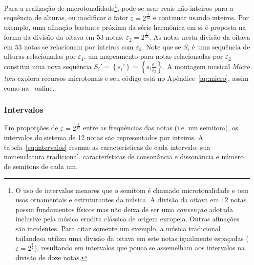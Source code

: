 Para a realização de microtonalidade\footnote{O uso de
intervalos menores que o semitom é chamado microtonalidade e tem usos
ornamentais e estruturantes da música. A
divisão da oitava em $12$ notas possui fundamentos físicos mas
não deixa de ser uma \emph{convenção}
adotada inclusive pela música erudita clássica de origem europeia. Outras afinações
são incidentes. Para citar somente um exemplo, a
música tradicional tailandesa utiliza uma divisão da oitava em sete notas igualmente
espaçadas ($\varepsilon=2^{\frac{1}{7}}$),
resultando em intervalos que pouco se assemelham aos intervalos na
divisão de doze notas.\cite{Wisnick}},
pode-se usar reais não inteiros
para a sequência de alturas, ou modificar o fator $\varepsilon=2^{\frac{1}{12}}$
e continuar usando inteiros. Por exemplo, uma afinação
bastante próxima da série harmônica em si
é proposta na forma da divisão da oitava em $53$ notas:
$\varepsilon_2=2^{\frac{1}{53}}$.\cite{microtonalidade}
As notas nesta divisão da oitava em $53$ notas se relacionam por inteiros
com $\varepsilon_2$.
Note que se $S_i$ é uma sequência de alturas relacionadas por $\varepsilon_1$,
um mapeamento para notas relacionadas por $\varepsilon_2$
constitui uma nova sequência $S_i'=\left\{s_i'\right\}=\left\{ s_i \frac{\varepsilon_1}{\varepsilon_2}\right\}$. A montagem musical \emph{Micro tom} explora recursos microtonais e seu código está no Apêndice~\ref{ap:micro}, assim como na \massa\ online.



\subsubsection{Intervalos}\label{subsec:intervalos}
Em proporções de $\varepsilon=2^{\frac{1}{12}}$ entre as frequências das notas (i.e. um semitom), os intervalos do sistema de 12 notas são representados por inteiros. A tabela~\ref{eq:intervalos} resume as características de cada intervalo: sua nomenclatura tradicional, características de consonância e dissonância e número de semitons de cada um.

